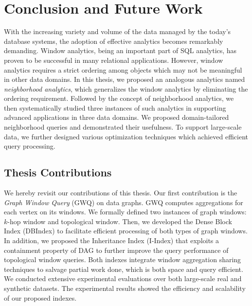 \chapter{Conclusion and Future Work}
With the increasing variety and volume of the data managed
by the today's database systems, the adoption of effective 
analytics becomes remarkably demanding. 
Window analytics, being
an important part of SQL analytics, has proven to be successful in
many relational applications. However, window analytics requires a
strict ordering among objects which may not be meaningful
in other data domains.  In this thesis, we proposed
an analogous analytics named \emph{neighborhood analytics},
which generalizes the window analytics by eliminating the
ordering requirement. Followed by the concept of
neighborhood analytics, we then systematically studied
three instances of such analytics in supporting advanced applications
in three data domains.
We proposed domain-tailored neighborhood queries and demonstrated
their usefulness. To support large-scale data, 
we further designed various optimization techniques which achieved
efficient query processing.

\section{Thesis Contributions}
We hereby revisit our contributions of this thesis. Our first
contribution is the \emph{Graph Window Query} (GWQ) on data graphs. 
GWQ computes aggregations for each vertex on its windows.
We formally defined two instances of graph windows: $k$-hop window and topological window. 
Then, we developed the Dense Block Index (DBIndex) to facilitate efficient 
processing of both types of graph windows. In addition, 
we proposed the Inheritance Index (I-Index) that exploits a
containment property of DAG to further improve the query performance of topological window queries. 
Both indexes integrate window aggregation sharing techniques to salvage partial work done, 
which is both space and query efficient. 
We conducted extensive experimental evaluations over both large-scale real and synthetic datasets. The experimental results showed the efficiency and scalability of our proposed indexes. 

